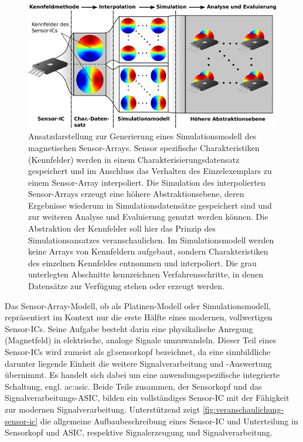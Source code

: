\vspace{5mm}
\begin{figure}[bph]
	\centering
	\includegraphics[width=\linewidth]{chapters/images/1-Motivation/Ansatz_Simulationsmodell}
	\caption[Ansatzdarstellung zur Generierung eines Simulationsmodell des magnetischen Sensor-Arrays]{Ansatzdarstellung zur Generierung eines Simulationsmodell des magnetischen Sensor-Arrays. Sensor spezifische Charakteristiken (Kennfelder) werden in einem Charakterisierungsdatensatz gespeichert und im Anschluss das Verhalten des Einzelexemplars zu einem Sensor-Array interpoliert. Die Simulation des interpolierten Sensor-Arrays erzeugt eine höhere Abstraktionsebene, deren Ergebnisse wiederum in Simulationsdatensätze gespeichert sind und zur weiteren Analyse und Evaluierung genutzt werden können. Die Abstraktion der Kennfelder soll hier das Prinzip des Simulationsansatzes veranschaulichen. Im Simulationsmodell werden keine Arrays von Kennfeldern aufgebaut, sondern Charakteristiken des einzelnen Kennfeldes entnommen und interpoliert. Die grau unterlegten Abschnitte kennzeichnen Verfahrensschritte, in denen Datensätze zur Verfügung stehen oder erzeugt werden.}
	\label{fig:ansatz-simulationsmodell}
\end{figure}


\clearpage


Das Sensor-Array-Modell, ob als Platinen-Modell oder Simulationsmodell, repräsentiert im Kontext nur die erste Hälfte 
eines modernen, vollwertigen Sensor-ICs. Seine Aufgabe besteht darin eine physikalische Anregung (Magnetfeld) in 
elektrische, analoge Signale umzuwandeln. Dieser Teil eines Sensor-ICs wird zumeist als \gls{gl:sensorkopf} bezeichnet, 
da eine sinnbildliche darunter liegende Einheit die weitere Signalverarbeitung und -Auswertung übernimmt. Es handelt 
sich dabei um eine anwendungsspezifische integrierte Schaltung, engl. \gls{ac:asic}. Beide Teile zusammen, der 
Sensorkopf und das Signalverarbeitungs-ASIC, bilden ein vollständiges Sensor-IC mit der Fähigkeit zur modernen 
Signalverarbeitung.
Unterstützend zeigt \autoref{fig:veranschaulichung-sensor-ic} die allgemeine Aufbaubeschreibung eines Sensor-IC und Unterteilung in Sensorkopf und ASIC, respektive Signalerzeugung und Signalverarbeitung.


